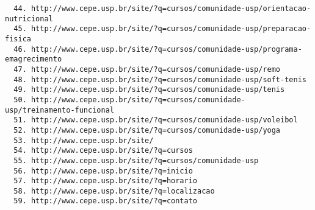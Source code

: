 \documentclass[brazil]{article}
\begin{document}
\begin{small}
\begin{verbatim}
  44. http://www.cepe.usp.br/site/?q=cursos/comunidade-usp/orientacao-nutricional
  45. http://www.cepe.usp.br/site/?q=cursos/comunidade-usp/preparacao-fisica
  46. http://www.cepe.usp.br/site/?q=cursos/comunidade-usp/programa-emagrecimento
  47. http://www.cepe.usp.br/site/?q=cursos/comunidade-usp/remo
  48. http://www.cepe.usp.br/site/?q=cursos/comunidade-usp/soft-tenis
  49. http://www.cepe.usp.br/site/?q=cursos/comunidade-usp/tenis
  50. http://www.cepe.usp.br/site/?q=cursos/comunidade-usp/treinamento-funcional
  51. http://www.cepe.usp.br/site/?q=cursos/comunidade-usp/voleibol
  52. http://www.cepe.usp.br/site/?q=cursos/comunidade-usp/yoga
  53. http://www.cepe.usp.br/site/
  54. http://www.cepe.usp.br/site/?q=cursos
  55. http://www.cepe.usp.br/site/?q=cursos/comunidade-usp
  56. http://www.cepe.usp.br/site/?q=inicio
  57. http://www.cepe.usp.br/site/?q=horario
  58. http://www.cepe.usp.br/site/?q=localizacao
  59. http://www.cepe.usp.br/site/?q=contato
\end{verbatim}
\end{small}
\end{document}
